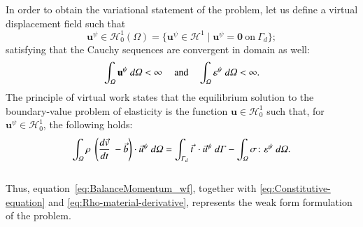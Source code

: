 \documentclass[preprint,12pt,a4paper]{elsarticle}
\newcommand{\vect}[1]{
  \ensuremath{\mathbf{{#1}}}
}
\newcommand{\tens}[1]{
  \ensuremath{\mathbf{{#1}}}
}
\newcommand{\Integral}[2]{
  \IfStrEqCase{#1}{
    {2}{\ensuremath{\int_{\varGamma_d}{#2}\ d\varGamma}}
    {3}{\ensuremath{\int_{\varOmega}{#2}\ d\varOmega}}
  }
}
\begin{document}
In order to obtain the variational statement of the problem, let us define a
virtual displacement field such that
\begin{equation}
  \label{eq:Hilbert-space}
  \vect{u}^{\psi} \in \mathcal{H}^1_0(\Omega) = \{ \vect{u}^{\psi} \in
  \mathcal{H}^1 \mid \vect{u}^{\psi} = \vect{0}\ \text{on}\ \Gamma_d \};
\end{equation}
satisfying that the Cauchy sequences are convergent in \gls{domain} as well:
\begin{equation}
  \label{eq:cauchy-secuence}
  \Integral{3}{\vect{u}^{\psi}} < \infty\ \quad\text{and}\quad
  \Integral{3}{\tens{\varepsilon}^{\psi}} < \infty.
\end{equation}
The principle of virtual work states that the equilibrium solution to
the boundary-value problem of elasticity is the function $\vect{u} \in
\mathcal{H}^1_0$ such that, for $\vect{u}^{\psi} \in
\mathcal{H}^1_0$, the following holds:
\begin{equation}
  \label{eq:BalanceMomentum_wf}
  \Integral{3}{\rho\ \left( \frac{d\vec{v}}{dt}\ - \vec{b} \right) \cdot \vec{u}^{\psi}} =
  \Integral{2}{\vec{t}\ \cdot \vec{u}^{\psi}} - \Integral{3}{\tens{\sigma} \colon
   \tens{\varepsilon}^{\psi}}.
\end{equation}\\
Thus, equation~\eqref{eq:BalanceMomentum_wf}, together with
\eqref{eq:Constitutive-equation} and
\eqref{eq:Rho-material-derivative}, represents the weak form
formulation of the problem.
\end{document}
